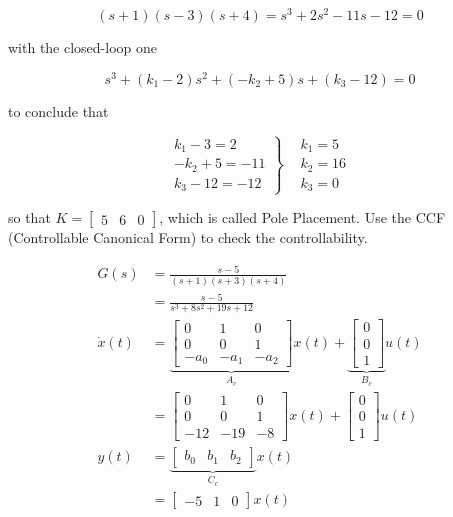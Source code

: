 \documentclass[main.tex]{subfiles}
\begin{document}
\begin{enumerate}
\begin{enumerate}
        $$
        (s+1)(s-3)(s+4)= s^3 + 2s^2 - 11s - 12 = 0
        $$
        
        with the closed-loop one
        
        $$
        s^3 + (k_1-2)s^2 + (-k_2 + 5)s + (k_3 - 12) = 0
        $$
        
        to conclude that
        
        $$
        \left.\begin{array}{c}
        k_1-3 = 2 \\
        -k_2 + 5 = -11 \\
        k_3 - 12 = -12
        \end{array}\right\} \begin{aligned}
        & k_1 = 5 \\
        & k_2 = 16 \\
        & k_3 = 0
        \end{aligned}
        $$
        
        so that $K=\left[\begin{array}{lll}5 & 6 & 0\end{array}\right]$, which is called Pole Placement. Use the CCF (Controllable Canonical Form) to check the controllability. 

        $$
        \begin{aligned}
        G(s) &= \frac{s-5}{(s+1)(s+3)(s+4)}\\
        &= \frac{s-5}{s^3+8 s^2+19 s+12}\\
        \dot{x}(t) & =\underbrace{\left[\begin{array}{ccc}
        0 & 1 & 0 \\
        0 & 0 & 1 \\
        -a_0 & -a_1 & -a_2
        \end{array}\right]}_{A_c}x(t)+\underbrace{\left[\begin{array}{l}
        0 \\
        0 \\
        1
        \end{array}\right]}_{B_c} u(t) \\
        & =\left[\begin{array}{ccc}
        0 & 1 & 0 \\
        0 & 0 & 1 \\
        -12 & -19 & -8
        \end{array}\right]x(t)+\left[\begin{array}{l}
        0 \\
        0 \\
        1
        \end{array}\right] u(t) \\
        y(t) & =\underbrace{\left[\begin{array}{lll}
        b_0 & b_1 & b_2
        \end{array}\right]}_{C_c}x(t)\\
        & =\left[\begin{array}{lll}
        -5 & 1 & 0
        \end{array}\right]x(t)
        \end{aligned}
        $$
        

\end{enumerate}
\end{enumerate}
\end{document}
